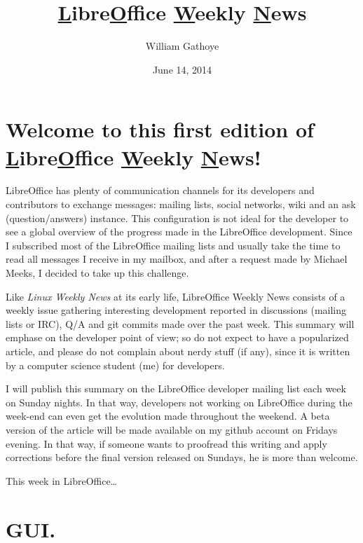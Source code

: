\documentclass{article}
\begin{document}
\title{\underline{L}ibre\underline{O}ffice \underline{W}eekly \underline{N}ews}
\author{William Gathoye}
\date{June 14, 2014}
\maketitle



\section{\texorpdfstring{Welcome to this first edition of
\underline{L}ibre\underline{O}ffice \underline{W}eekly
\underline{N}ews!}{}}

LibreOffice has plenty of communication channels for its developers and
contributors to exchange messages: mailing lists, social networks, wiki and an
ask (question/answers) instance. This configuration is not ideal for the
developer to see a global overview of the progress made in the LibreOffice
development. Since I subscribed most of the LibreOffice mailing lists and
usually take the time to read all messages I receive in my mailbox, and after
a request made by Michael Meeks, I decided to take up this challenge.

Like \emph{Linux Weekly News} at its early life, LibreOffice Weekly News
consists of a weekly issue gathering interesting development reported in
discussions (mailing lists or IRC), Q/A and git commits made over the past
week. This summary will emphase on the developer point of view; so do not
expect to have a popularized article, and please do not complain about nerdy
stuff (if any), since it is written by a computer science student (me) for
developers. 

I will publish this summary on the LibreOffice developer mailing list each week
on Sunday nights. In that way, developers not working on LibreOffice during the
week-end can even get the evolution made throughout the weekend. A beta version
of the article will be made available on my github account\cite{wgetGithub} on
Fridays evening. In that way, if someone wants to proofread this writing and
apply corrections before the final version released on Sundays, he is more than
welcome.

This week in LibreOffice\ldots



\section{GUI.}
\end{document}
